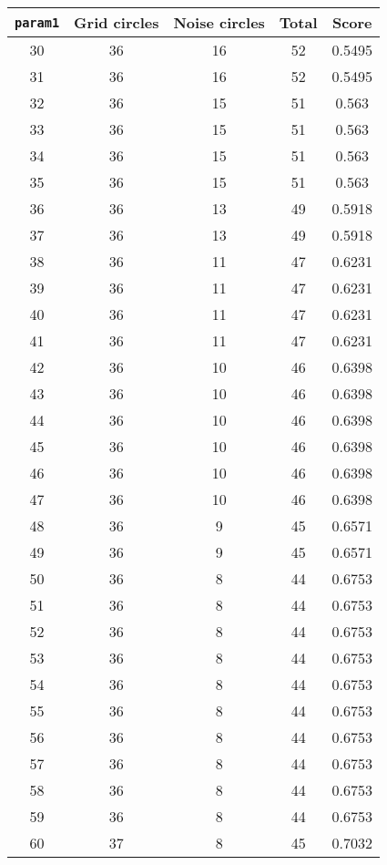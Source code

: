 \documentclass[letterpaper, 12pt]{article}
\begin{document}
\begin{longtable}{|c|c|c|c|c|}
\hline
\textbf{\texttt{param1}} & \textbf{Grid circles} & \textbf{Noise circles} & \textbf{Total} & \textbf{Score} \\
\hline
30 & 36 & 16 & 52 & 0.5495 \\
\hline
31 & 36 & 16 & 52 & 0.5495 \\
\hline
32 & 36 & 15 & 51 & 0.563 \\
\hline
33 & 36 & 15 & 51 & 0.563 \\
\hline
34 & 36 & 15 & 51 & 0.563 \\
\hline
35 & 36 & 15 & 51 & 0.563 \\
\hline
36 & 36 & 13 & 49 & 0.5918 \\
\hline
37 & 36 & 13 & 49 & 0.5918 \\
\hline
38 & 36 & 11 & 47 & 0.6231 \\
\hline
39 & 36 & 11 & 47 & 0.6231 \\
\hline
40 & 36 & 11 & 47 & 0.6231 \\
\hline
41 & 36 & 11 & 47 & 0.6231 \\
\hline
42 & 36 & 10 & 46 & 0.6398 \\
\hline
43 & 36 & 10 & 46 & 0.6398 \\
\hline
44 & 36 & 10 & 46 & 0.6398 \\
\hline
45 & 36 & 10 & 46 & 0.6398 \\
\hline
46 & 36 & 10 & 46 & 0.6398 \\
\hline
47 & 36 & 10 & 46 & 0.6398 \\
\hline
48 & 36 & 9 & 45 & 0.6571 \\
\hline
49 & 36 & 9 & 45 & 0.6571 \\
\hline
50 & 36 & 8 & 44 & 0.6753 \\
\hline
51 & 36 & 8 & 44 & 0.6753 \\
\hline
52 & 36 & 8 & 44 & 0.6753 \\
\hline
53 & 36 & 8 & 44 & 0.6753 \\
\hline
54 & 36 & 8 & 44 & 0.6753 \\
\hline
55 & 36 & 8 & 44 & 0.6753 \\
\hline
56 & 36 & 8 & 44 & 0.6753 \\
\hline
57 & 36 & 8 & 44 & 0.6753 \\
\hline
58 & 36 & 8 & 44 & 0.6753 \\
\hline
59 & 36 & 8 & 44 & 0.6753 \\
\hline
60 & 37 & 8 & 45 & 0.7032 \\
\hline

\end{longtable}
\end{document}
